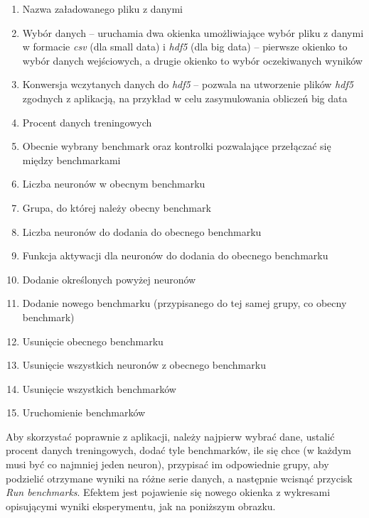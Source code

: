 \documentclass{article}
\begin{document}
\begin{enumerate}
\item Nazwa załadowanego pliku z danymi
\item Wybór danych -- uruchamia dwa okienka umożliwiające wybór pliku z danymi w formacie \textit{csv} (dla small data) i \textit{hdf5} (dla big data) -- pierwsze okienko to wybór danych wejściowych, a drugie okienko to wybór oczekiwanych wyników
\item Konwersja wczytanych danych do \textit{hdf5} -- pozwala na utworzenie plików \textit{hdf5} zgodnych z aplikacją, na przykład w celu zasymulowania obliczeń big data
\item Procent danych treningowych
\item Obecnie wybrany benchmark oraz kontrolki pozwalające przełączać się między benchmarkami
\item Liczba neuronów w obecnym benchmarku
\item Grupa, do której należy obecny benchmark
\item Liczba neuronów do dodania do obecnego benchmarku
\item Funkcja aktywacji dla neuronów do dodania do obecnego benchmarku
\item Dodanie określonych powyżej neuronów
\item Dodanie nowego benchmarku (przypisanego do tej samej grupy, co obecny benchmark)
\item Usunięcie obecnego benchmarku
\item Usunięcie wszystkich neuronów z obecnego benchmarku
\item Usunięcie wszystkich benchmarków
\item Uruchomienie benchmarków
\end{enumerate}
Aby skorzystać poprawnie z aplikacji, należy najpierw wybrać dane, ustalić procent danych treningowych, dodać tyle benchmarków, ile się chce (w każdym musi być co najmniej jeden neuron), przypisać im odpowiednie grupy, aby podzielić otrzymane wyniki na różne serie danych, a następnie wcisnąć przycisk \textit{Run benchmarks}. Efektem jest pojawienie się nowego okienka z wykresami opisującymi wyniki eksperymentu, jak na poniższym obrazku.
\end{document}

